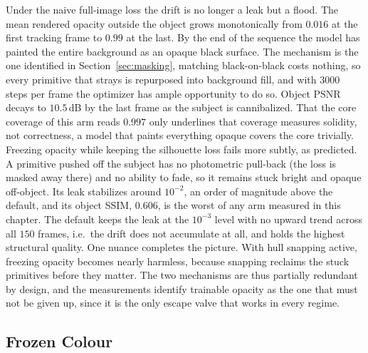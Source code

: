 Under the naive full-image loss the drift is no longer a leak but a flood. The mean
rendered opacity outside the object grows monotonically from $0.016$ at the first
tracking frame to $0.99$ at the last. By the end of the sequence the model has
painted the entire background as an opaque black surface. The mechanism is
the one identified in Section~\ref{sec:masking}, matching black-on-black
costs nothing, so every primitive that strays is repurposed into background fill,
and with $3000$ steps per frame the optimizer has ample opportunity to do so. Object PSNR decays to $10.5$\,dB by the last frame as the subject is cannibalized. That the
core coverage of this arm reads $0.997$ only underlines that coverage measures
solidity, not correctness, a model that paints everything opaque covers the core
trivially. Freezing opacity while keeping the silhouette loss fails more subtly, as
predicted. A primitive pushed off the subject has no photometric pull-back (the loss
is masked away there) and no ability to fade, so it remains stuck bright and
opaque off-object. Its leak stabilizes around $10^{-2}$, an order of magnitude above
the default, and its object SSIM, $0.606$, is the worst of any arm measured in this
chapter. The default keeps the leak at the $10^{-3}$ level with no upward trend
across all $150$ frames, i.e.\ the drift does not accumulate at all, and holds the
highest structural quality. One nuance completes the picture. With hull snapping
active, freezing opacity becomes nearly harmless, because snapping reclaims the stuck
primitives before they matter. The two mechanisms are thus partially redundant by
design, and the measurements identify trainable opacity as the one that must not be
given up, since it is the only escape valve that works in every regime.

\subsection{Frozen Colour}
\label{sec:results-colour}

